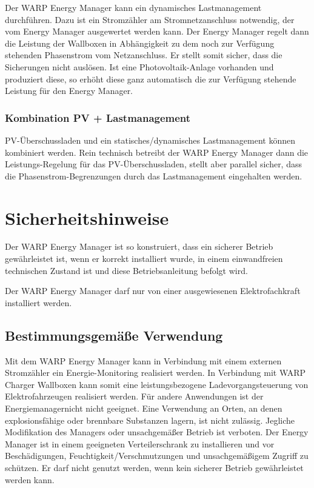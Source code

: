 \documentclass[a4paper,10pt]{article}
\newcommand{\hint}[1]{\begin{tcolorbox}[colback=boxgray,colframe=black,coltext=
white,title=Hinweis,left*=2mm,right*=2mm,boxsep=1mm,bottom=1mm,top=1mm]#1\end{tcolorbox}}
\begin{document}
\begin{multicols*}{2}
	Der WARP Energy Manager kann ein dynamisches Lastmanagement durchführen.
	Dazu ist ein Stromzähler am Stromnetzanschluss notwendig, der vom Energy Manager
	ausgewertet werden kann. Der Energy Manager regelt dann die Leistung der Wallboxen 
	in Abhängigkeit zu dem noch zur Verfügung stehenden Phasenstrom vom Netzanschluss. 
	Er stellt somit sicher, dass die Sicherungen nicht auslösen. Ist eine 
	Photovoltaik-Anlage vorhanden und produziert diese, so erhöht diese ganz automatisch 
	die zur Verfügung stehende Leistung für den Energy Manager.

	\subsubsection{Kombination PV + Lastmanagement}
	PV-Überschussladen und ein statisches/dynamisches Lastmanagement können
	kombiniert werden. Rein technisch betreibt der WARP Energy Manager dann die
	Leistungs-Regelung für das PV-Überschussladen, stellt aber parallel sicher, dass die
	Phasenstrom-Begrenzungen durch das Lastmanagement eingehalten werden.

	\newpage
	\section{Sicherheitshinweise}
	Der WARP Energy Manager ist so konstruiert, dass ein sicherer Betrieb gewährleistet ist,
	wenn er korrekt installiert wurde, in einem einwandfreien technischen Zustand
	ist und diese Betriebsanleitung befolgt wird. \hint{Der WARP Energy Manager darf nur von einer ausgewiesenen Elektrofachkraft installiert
		werden.}

	\subsection{Bestimmungsgemäße Verwendung}
	Mit dem WARP Energy Manager kann in Verbindung mit einem externen
	Stromzähler ein Energie-Monitoring realisiert werden. In Verbindung mit WARP
	Charger Wallboxen kann somit eine leistungsbezogene Ladevorgangsteuerung von
	Elektrofahrzeugen realisiert werden. Für andere Anwendungen ist der
	Energiemanagernicht nicht geeignet. Eine Verwendung
	an Orten, an denen explosionsfähige oder brennbare Substanzen lagern, ist nicht
	zulässig. Jegliche Modifikation des Managers oder unsachgemäßer Betrieb ist verboten. 
	Der Energy Manager ist in einem geeigneten Verteilerschrank zu installieren
	und vor Beschädigungen, Feuchtigkeit/Verschmutzungen und unsachgemäßigem
	Zugriff zu 	schützen. Er darf nicht genutzt werden, wenn kein sicherer Betrieb
	gewährleistet werden kann.


\end{multicols*}
\end{document}
